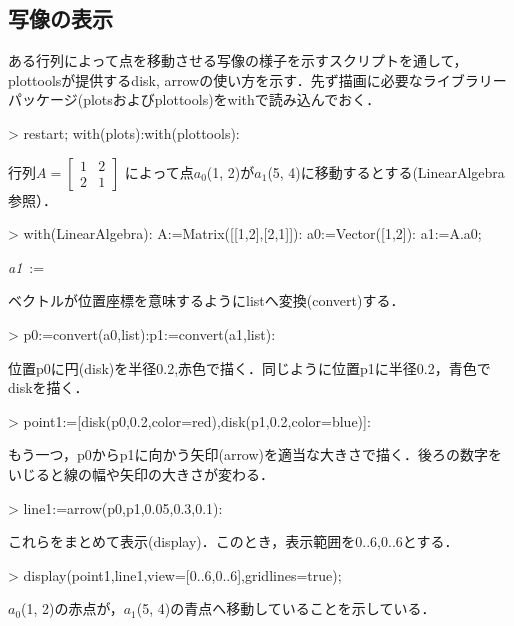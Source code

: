 \subsection{写像の表示}
ある行列によって点を移動させる写像の様子を示すスクリプトを通して，plottoolsが提供するdisk, arrowの使い方を示す．先ず描画に必要なライブラリーパッケージ(plotsおよびplottools)をwithで読み込んでおく．
\begin{MapleInput}
> restart; with(plots):with(plottools):
\end{MapleInput}
\begin{MapleOutput}
\end{MapleOutput}
行列$A= \left[ \begin {array}{cc} 1&2\\ 2&1\end {array} \right]$
によって点$a_0$(1, 2)が$a_1$(5, 4)に移動するとする(LinearAlgebra参照）．
\begin{MapleInput}
> with(LinearAlgebra): A:=Matrix([[1,2],[2,1]]): a0:=Vector([1,2]): a1:=A.a0;
\end{MapleInput}
\begin{MapleOutput}
{\it a1}\, := \, \left[ \begin {array}{c} 5\\ 4\end {array} \right]
\end{MapleOutput}
ベクトルが位置座標を意味するようにlistへ変換(convert)する．
\begin{MapleInput}
> p0:=convert(a0,list):p1:=convert(a1,list):
\end{MapleInput}
位置p0に円(disk)を半径0.2,赤色で描く．同じように位置p1に半径0.2，青色でdiskを描く．
\begin{MapleInput}
> point1:=[disk(p0,0.2,color=red),disk(p1,0.2,color=blue)]:
\end{MapleInput}
もう一つ，p0からp1に向かう矢印(arrow)を適当な大きさで描く．後ろの数字をいじると線の幅や矢印の大きさが変わる．
\begin{MapleInput}
> line1:=arrow(p0,p1,0.05,0.3,0.1):
\end{MapleInput}
これらをまとめて表示(display)．このとき，表示範囲を0..6,0..6とする．
\begin{MapleInput}
> display(point1,line1,view=[0..6,0..6],gridlines=true);
\end{MapleInput}
$a_0$(1, 2)の赤点が，$a_1$(5, 4)の青点へ移動していることを示している．

